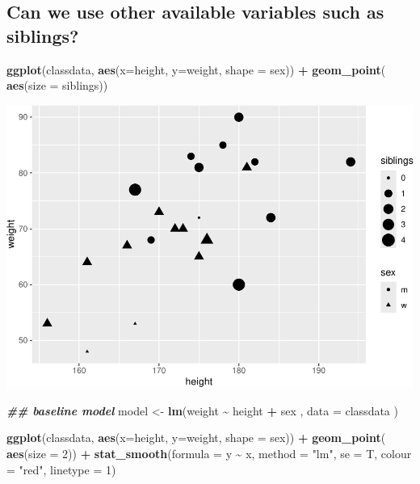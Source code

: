 \documentclass[
  doc]{apa6}
\newenvironment{Shaded}{\begin{snugshade}}{\end{snugshade}}
\newcommand{\AttributeTok}[1]{\textcolor[rgb]{0.13,0.29,0.53}{#1}}
\newcommand{\DecValTok}[1]{\textcolor[rgb]{0.00,0.00,0.81}{#1}}
\newcommand{\DocumentationTok}[1]{\textcolor[rgb]{0.56,0.35,0.01}{\textbf{\textit{#1}}}}
\newcommand{\FunctionTok}[1]{\textcolor[rgb]{0.13,0.29,0.53}{\textbf{#1}}}
\newcommand{\NormalTok}[1]{#1}
\newcommand{\OtherTok}[1]{\textcolor[rgb]{0.56,0.35,0.01}{#1}}
\newcommand{\SpecialCharTok}[1]{\textcolor[rgb]{0.81,0.36,0.00}{\textbf{#1}}}
\newcommand{\StringTok}[1]{\textcolor[rgb]{0.31,0.60,0.02}{#1}}
\begin{document}
\newpage

\subsection{Can we use other available variables such as siblings?}\label{can-we-use-other-available-variables-such-as-siblings}

\begin{Shaded}
\begin{Highlighting}[]
\FunctionTok{ggplot}\NormalTok{(classdata, }\FunctionTok{aes}\NormalTok{(}\AttributeTok{x=}\NormalTok{height, }\AttributeTok{y=}\NormalTok{weight, }\AttributeTok{shape =}\NormalTok{ sex)) }\SpecialCharTok{+}
  \FunctionTok{geom\_point}\NormalTok{( }\FunctionTok{aes}\NormalTok{(}\AttributeTok{size =}\NormalTok{ siblings)) }
\end{Highlighting}
\end{Shaded}

\includegraphics{rmd_reg_files/figure-latex/unnamed-chunk-14-1.pdf}

\begin{Shaded}
\begin{Highlighting}[]
\DocumentationTok{\#\# baseline model}
\NormalTok{model  }\OtherTok{\textless{}{-}} \FunctionTok{lm}\NormalTok{(weight }\SpecialCharTok{\textasciitilde{}}\NormalTok{ height }\SpecialCharTok{+}\NormalTok{ sex , }\AttributeTok{data =}\NormalTok{ classdata )}

\FunctionTok{ggplot}\NormalTok{(classdata, }\FunctionTok{aes}\NormalTok{(}\AttributeTok{x=}\NormalTok{height, }\AttributeTok{y=}\NormalTok{weight, }\AttributeTok{shape =}\NormalTok{ sex)) }\SpecialCharTok{+}
  \FunctionTok{geom\_point}\NormalTok{( }\FunctionTok{aes}\NormalTok{(}\AttributeTok{size =} \DecValTok{2}\NormalTok{)) }\SpecialCharTok{+}
  \FunctionTok{stat\_smooth}\NormalTok{(}\AttributeTok{formula =}\NormalTok{ y }\SpecialCharTok{\textasciitilde{}}\NormalTok{ x,  }
              \AttributeTok{method =} \StringTok{"lm"}\NormalTok{, }
              \AttributeTok{se =}\NormalTok{ T, }
              \AttributeTok{colour =} \StringTok{"red"}\NormalTok{, }
              \AttributeTok{linetype =} \DecValTok{1}\NormalTok{)}
\end{Highlighting}
\end{Shaded}
\end{document}
